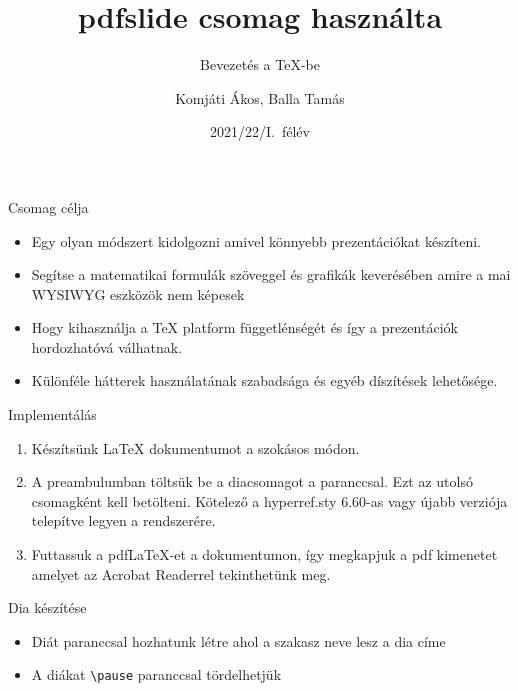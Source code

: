 \documentclass{beamer}
\begin{document}
\author{Komjáti Ákos, Balla Tamás}
\title{pdfslide csomag használta}
\subtitle{Bevezetés a \TeX-be}
\date{2021/22/I.\ félév}

\frame[plain]{\maketitle}
\begin{frame}{Csomag célja}
\begin{itemize}

\item Egy olyan módszert kidolgozni amivel könnyebb prezentációkat készíteni.\pause

\item Segítse a matematikai formulák szöveggel és grafikák keverésében amire a mai WYSIWYG eszközök nem képesek\pause

\item Hogy kihasználja a \TeX{} platform függetlénségét és így a prezentációk hordozhatóvá válhatnak.\pause

\item Különféle hátterek használatának szabadsága és egyéb díszítések lehetősége.

\end{itemize}
\end{frame}

\begin{frame}[fragile]{Implementálás}
\begin{enumerate}
\item Készítsünk \LaTeX{} dokumentumot a szokásos módon. \pause
\item A preambulumban töltsük be a diacsomagot a \color{red}{\verb|\usepackage{pdfslide}|}\color{black}paranccsal. Ezt az utolsó csomagként kell betölteni. Kötelező a hyperref.sty 6.60-as vagy újabb verziója telepítve legyen a rendszerére. \pause
\item Futtassuk a pdf\LaTeX{}-et a dokumentumon, így megkapjuk a pdf kimenetet
amelyet az Acrobat Readerrel tekinthetünk meg.
 
\end{enumerate}
\end{frame}

\begin{frame}[fragile]{Dia készítése}
\begin{itemize}
\item 
Diát  \color{black} paranccsal hozhatunk létre ahol a szakasz neve lesz a dia címe
\pause
\item A diákat  \color{red}\verb|\pause| \color{black}paranccsal tördelhetjük  
\end{itemize}
\end{frame}
\end{document}
